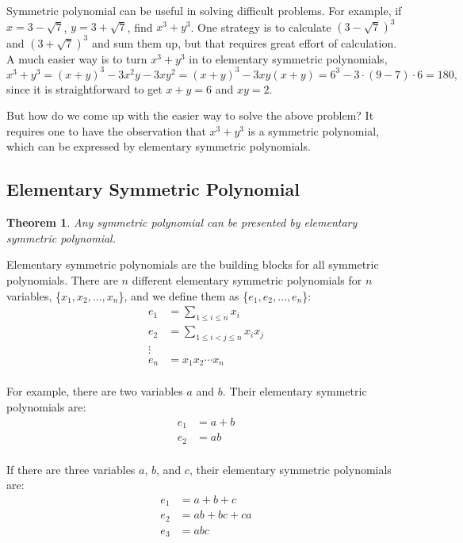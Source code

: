 \documentclass[11pt, oneside]{article}   	%
\newtheorem{theorem}{Theorem}
\begin{document}
Symmetric polynomial can be useful in solving difficult problems. For example, if $x=3-\sqrt{7}$, $y=3+\sqrt{7}$, find $x^3+y^3$. One strategy is to calculate $(3-\sqrt{7})^3$ and $(3+\sqrt{7})^3$ and sum them up, but that requires great effort of calculation. A much easier way is to turn $x^3+y^3$ in to elementary symmetric polynomials, 
\[x^3+y^3 = (x+y)^3 - 3x^2y - 3xy^2 = (x+y)^3 - 3xy(x+y) = 6^3-3\cdot (9-7)\cdot 6 = 180, \] 
since it is straightforward to get $x+y=6$ and $xy=2$. 

But how do we come up with the easier way to solve the above problem? It requires one to have the observation that $x^3+y^3$ is a symmetric polynomial, which can be expressed by elementary symmetric polynomials.   


\subsection{Elementary Symmetric Polynomial}
\begin{theorem}
Any symmetric polynomial can be presented by elementary symmetric polynomial. 
\end{theorem}

Elementary symmetric polynomials are the building blocks for all symmetric polynomials. There are $n$ different elementary symmetric polynomials for $n$ variables, \{$x_1,x_2,\dots ,x_n$\}, and we define them as \{$e_1, e_2, \dots ,e_n$\}: 
\begin{align*}
e_1 &=\sum_{1\le i\le n} x_i\\
e_2 &=\sum_{1\le i< j\le n} x_i x_j\\
\vdots\\
e_n &=x_1 x_2 \cdots x_n\\
\end{align*}
 
For example, there are two variables $a$ and $b$. Their elementary symmetric polynomials are: 
\begin{align*}
e_1 &=a+b\\
e_2 &=ab\\
\end{align*}

If there are three variables $a$, $b$, and $c$, their elementary symmetric polynomials are: 
\begin{align*}
e_1 &=a+b+c\\
e_2 &=ab+bc+ca\\
e_3 &=abc \\
\end{align*}
\end{document}
